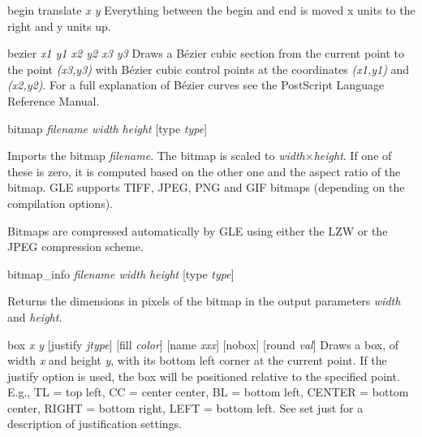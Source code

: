 \begin{commanddescription}
\item[{\sf begin translate {\it x y}}]
 Everything between the {\sf begin} and {\sf end} is moved
x units to the right and y units up.

\item[{\sf bezier {\it x1 y1 x2 y2 x3 y3}}]
Draws a B\'{e}zier cubic section from the current point to the point
{\it (x3,y3)} with B\'{e}zier cubic control points at the coordinates
{\it (x1,y1)} and {\it (x2,y2)}.  For a full explanation of B\'{e}zier curves
see the PostScript Language Reference Manual.


\item[{\sf bitmap {\it filename width height} [type {\it type}]}]

Imports the bitmap \textit{filename}. The bitmap is scaled to \textit{width}$\times$\textit{height}. If one of these is zero, it is computed based on the other one and the aspect ratio of the bitmap. GLE supports TIFF, JPEG, PNG and GIF bitmaps (depending on the compilation options).

Bitmaps are compressed automatically by GLE using either the LZW or the JPEG compression scheme.

\item[{\sf bitmap\_info {\it filename width height} [type {\it type}]}]

Returns the dimensions in pixels of the bitmap in the output parameters \textit{width} and \textit{height}.


\item[{\sf box {\it x y} [justify {\it jtype}] [fill {\it color}] [name {\it xxx}] [nobox] [round {\it val}]} ]
Draws a box, of width {\it x} and height {\it y}, with its bottom left corner
at the current point.  If the justify option is used, the box will
be positioned relative to the specified point. E.g.,  TL = top left,
CC = center center, BL = bottom left, CENTER = bottom center,
RIGHT = bottom right, LEFT = bottom left.  See {\sf set just} for a description
of justification settings.


\end{commanddescription}
